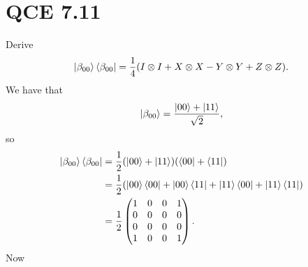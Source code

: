 \documentclass[10pt]{article}
\begin{document}
\section*{QCE 7.11}
Derive 
\[
\ket{\beta_{00}} \bra{\beta_{00}} = \frac{1}{4} (I \otimes I + X \otimes X - Y \otimes Y + Z \otimes Z).
\]
We have that 
\[
\ket{\beta_{00}} = \frac{\ket{00} + \ket{11}}{\sqrt{2}},
\]
so
\begin{align*}
\ket{\beta_{00}} \bra{\beta_{00}} &= \frac{1}{2} (\ket{00} + \ket{11})(\bra{00} + \bra{11}) \\
		&= \frac{1}{2} (\ket{00} \bra{00} + \ket{00} \bra{11} + \ket{11} \bra{00} + \ket{11} \bra{11}) \\
		&= \frac{1}{2}
		\begin{pmatrix}
		1 & 0 & 0 & 1 \\
		0 & 0 & 0 & 0 \\
		0 & 0 & 0 & 0 \\
		1 & 0 & 0 & 1 
		\end{pmatrix}.
\end{align*}
Now
\end{document}
